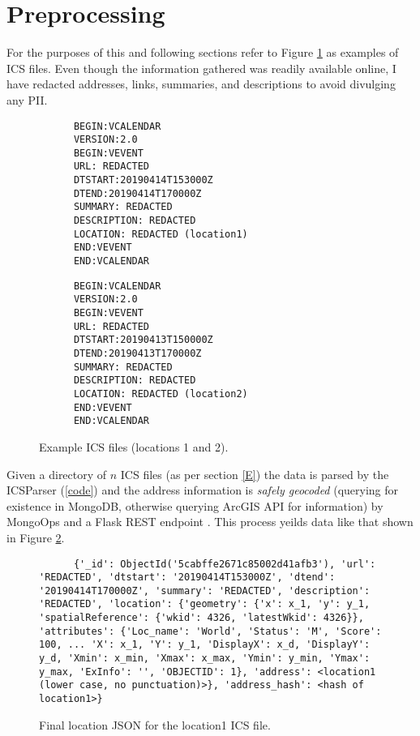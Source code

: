 \documentclass[11 pt]{IEEEtran}
\theoremstyle{definition}
\theoremstyle{definition}
\begin{document}
\section{Preprocessing}\label{preprocessing}
For the purposes of this and following sections refer to Figure \ref{ICS-Examples} as examples of ICS files. Even though the information gathered was readily available online, I have redacted addresses, links, summaries, and descriptions to avoid divulging any PII.
\begin{figure}[!htb]
  \begin{center}
    \begin{lstlisting}
      BEGIN:VCALENDAR
      VERSION:2.0
      BEGIN:VEVENT
      URL: REDACTED
      DTSTART:20190414T153000Z
      DTEND:20190414T170000Z
      SUMMARY: REDACTED
      DESCRIPTION: REDACTED
      LOCATION: REDACTED (location1)
      END:VEVENT
      END:VCALENDAR
    \end{lstlisting}
    \begin{lstlisting}
      BEGIN:VCALENDAR
      VERSION:2.0
      BEGIN:VEVENT
      URL: REDACTED
      DTSTART:20190413T150000Z
      DTEND:20190413T170000Z
      SUMMARY: REDACTED
      DESCRIPTION: REDACTED
      LOCATION: REDACTED (location2)
      END:VEVENT
      END:VCALENDAR
    \end{lstlisting}
    \caption{Example ICS files (locations 1 and 2).}\label{ICS-Examples}
    \end{center}
  \end{figure}

Given a directory of $n$ ICS files (as per section \ref{E}) the data is parsed by the ICSParser (\ref{code}) and the address information is \emph{safely geocoded} (querying for existence in MongoDB, otherwise querying ArcGIS API for information) by MongoOps and a Flask REST endpoint \cite{Flask}. This process yeilds data like that shown in Figure \ref{location1_data}.
\begin{figure}[!htb]
  \begin{center}
    \begin{lstlisting}
      {'_id': ObjectId('5cabffe2671c85002d41afb3'), 'url': 'REDACTED', 'dtstart': '20190414T153000Z', 'dtend': '20190414T170000Z', 'summary': 'REDACTED', 'description': 'REDACTED', 'location': {'geometry': {'x': x_1, 'y': y_1, 'spatialReference': {'wkid': 4326, 'latestWkid': 4326}}, 'attributes': {'Loc_name': 'World', 'Status': 'M', 'Score': 100, ... 'X': x_1, 'Y': y_1, 'DisplayX': x_d, 'DisplayY': y_d, 'Xmin': x_min, 'Xmax': x_max, 'Ymin': y_min, 'Ymax': y_max, 'ExInfo': '', 'OBJECTID': 1}, 'address': <location1 (lower case, no punctuation)>}, 'address_hash': <hash of location1>}
    \end{lstlisting}
    \caption{Final location JSON for the location1 ICS file.}\label{location1_data}
  \end{center}
\end{figure}
\end{document}
